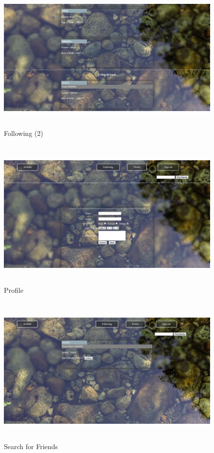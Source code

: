 \begin{figure}[!htbp]
	\begin{center}
		\includegraphics[width=14cm,height=7.5cm]{p4.png}
		\caption{Following (2)}
	\end{center}
\end{figure}
\begin{figure}[!htbp]
	\begin{center}
		\includegraphics[width=14cm,height=7.5cm]{p5.png}
		\caption{Profile}
	\end{center}
\end{figure}
\begin{figure}[!htbp]
	\begin{center}
		\includegraphics[width=14cm,height=7.5cm]{p6.png}
		\caption{Search for Friends}
	\end{center}
\end{figure}

